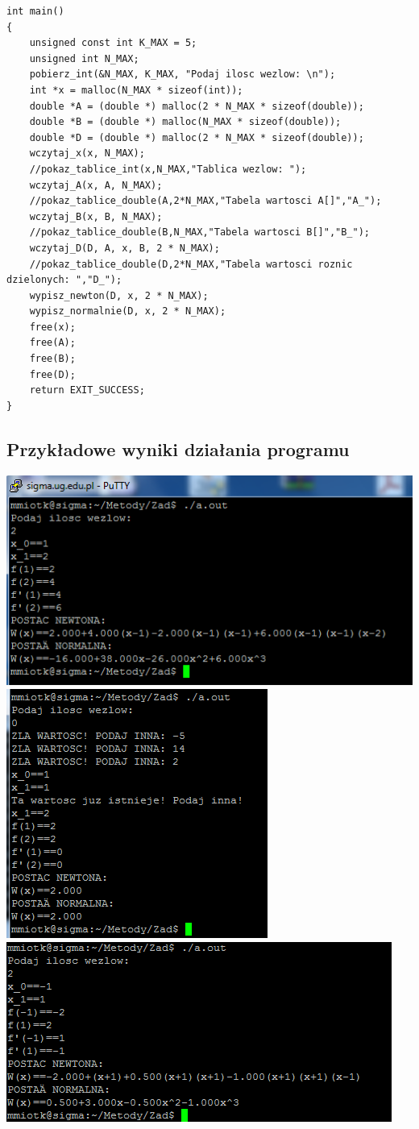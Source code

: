 \documentclass[16pt]{article} %
\begin{document}
\begin{lstlisting}[firstnumber=100]
int main()
{
    unsigned const int K_MAX = 5;
    unsigned int N_MAX;
    pobierz_int(&N_MAX, K_MAX, "Podaj ilosc wezlow: \n");
    int *x = malloc(N_MAX * sizeof(int));
    double *A = (double *) malloc(2 * N_MAX * sizeof(double));
    double *B = (double *) malloc(N_MAX * sizeof(double));
    double *D = (double *) malloc(2 * N_MAX * sizeof(double));
    wczytaj_x(x, N_MAX);
    //pokaz_tablice_int(x,N_MAX,"Tablica wezlow: ");
    wczytaj_A(x, A, N_MAX);
    //pokaz_tablice_double(A,2*N_MAX,"Tabela wartosci A[]","A_");
    wczytaj_B(x, B, N_MAX);
    //pokaz_tablice_double(B,N_MAX,"Tabela wartosci B[]","B_");
    wczytaj_D(D, A, x, B, 2 * N_MAX);
    //pokaz_tablice_double(D,2*N_MAX,"Tabela wartosci roznic dzielonych: ","D_");
    wypisz_newton(D, x, 2 * N_MAX);
    wypisz_normalnie(D, x, 2 * N_MAX);
    free(x);
    free(A);
    free(B);
    free(D);
    return EXIT_SUCCESS;
}

\end{lstlisting}
\subsection{Przykładowe wyniki działania programu}
\includegraphics {obraz_nowy1.png}\\
\includegraphics{obraz_nowy2.png}\\
\includegraphics{obraz_nowy3.png}
\end{document}
